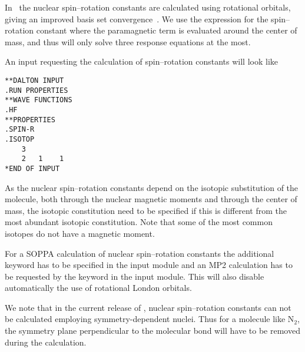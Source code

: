 \begin{center}
\end{center}


In \siraba\ the nuclear spin--rotation
constants are calculated using
rotational orbitals, giving an improved
basis set convergence~\cite{jgkrthjcp105}. We use the
expression for the spin--rotation constant where the paramagnetic term
is evaluated around the center of mass, and thus will only solve three
response equations at the most.

An input requesting the calculation of spin--rotation constants will
look like

\begin{verbatim}
**DALTON INPUT
.RUN PROPERTIES
**WAVE FUNCTIONS
.HF
**PROPERTIES
.SPIN-R
.ISOTOP
    3
    2   1    1
*END OF INPUT
\end{verbatim}

As the nuclear spin--rotation constants
depend on the isotopic substitution of
the molecule, both through the nuclear magnetic moments and through the
center of mass, the isotopic constitution need to be specified if this
is different  from the most abundant isotopic constitution. Note that
some of the most common isotopes do not have a magnetic moment.

For a SOPPA calculation of nuclear spin--rotation constants the 
additional 
keyword  has to be specified in the  input module 
and an MP2 calculation has to be requested by the keyword  in the 
 input module. This will also disable automatically
the use of rotational London orbitals.

We note that in the current release of \siraba , nuclear spin--rotation
constants can not be calculated employing symmetry-dependent
nuclei. Thus for a molecule like N$_2$, the symmetry plane
perpendicular to the molecular bond will have to be removed during the
calculation.

